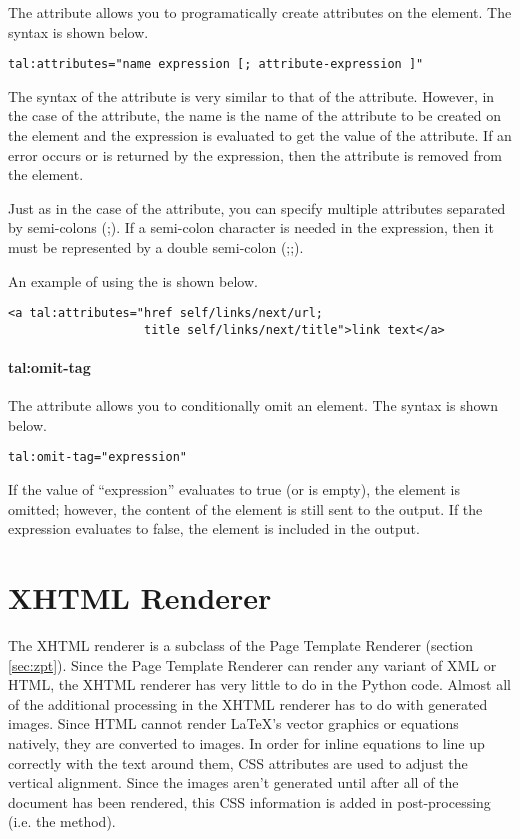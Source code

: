 The  attribute allows you to programatically create
attributes on the element.  The syntax is shown below.
\begin{verbatim}
tal:attributes="name expression [; attribute-expression ]"
\end{verbatim}

The syntax of the  attribute is very similar to
that of the  attribute.  However, in the case of the
 attribute, the name is the name of the attribute
to be created on the element and the expression is evaluated to
get the value of the attribute.  If an error occurs or  is
returned by the expression, then the attribute is removed from the
element.

Just as in the case of the  attribute, you can specify
multiple attributes separated by semi-colons (;).  If a semi-colon character
is needed in the expression, then it must be represented by a double
semi-colon (;;).

An example of using the  is shown below.
\begin{verbatim}
<a tal:attributes="href self/links/next/url;
                   title self/links/next/title">link text</a>
\end{verbatim}


\paragraph{tal:omit-tag}

The  attribute allows you to conditionally omit an
element.  The syntax is shown below.
\begin{verbatim}
tal:omit-tag="expression"
\end{verbatim}

If the value of ``expression'' evaluates to true (or is empty), the element
is omitted; however, the content of the element is still sent to the output.
If the expression evaluates to false, the element is included in the
output.


\section{XHTML Renderer}

The XHTML renderer is a subclass of the Page Template Renderer (section
\ref{sec:zpt}).  Since the Page Template Renderer can render any variant
of XML or HTML, the XHTML renderer has very little to do in the Python
code.  Almost all of the additional processing in the XHTML renderer has
to do with generated images.  Since HTML cannot render \LaTeX's vector
graphics or equations natively, they are converted to images.  In order
for inline equations to line up correctly with the text around them, CSS
attributes are used to adjust the vertical alignment.  Since the images
aren't generated until after all of the document has been rendered, this
CSS information is added in post-processing (i.e. the 
method).

